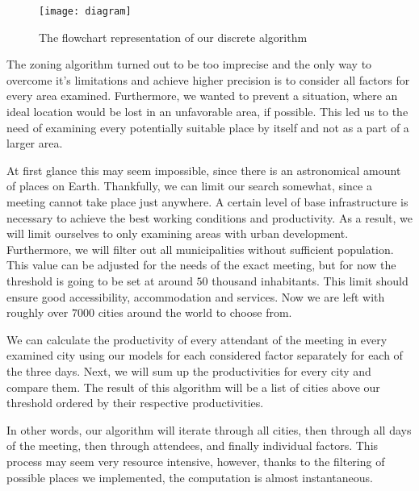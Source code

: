 

\begin{figure}
    \centering
        \texttt{[image: diagram]}
    \caption{The flowchart representation of our discrete algorithm}
\end{figure}

The zoning algorithm turned out to be too imprecise and the only way to overcome it's limitations and achieve higher precision is to consider all factors for every area examined. Furthermore, we wanted to prevent a situation, where an ideal location would be lost in an unfavorable area, if possible. This led us to the need of examining every potentially suitable place by itself and not as a part of a larger area.

At first glance this may seem impossible, since there is an astronomical amount of places on Earth. Thankfully, we can limit our search somewhat, since a meeting cannot take place just anywhere. A certain level of base infrastructure is necessary to achieve the best working conditions and productivity. As a result, we will limit ourselves to only examining areas with urban development. Furthermore, we will filter out all municipalities without sufficient population. This value can be adjusted for the needs of the exact meeting, but for now the threshold is going to be set at around $50$ thousand inhabitants. This limit should ensure good accessibility, accommodation and services. Now we are left with roughly over $7000$ cities around the world to choose from.

We can calculate the productivity of every attendant of the meeting in every examined city using our models for each considered factor separately for each of the three days. Next, we will sum up the productivities for every city and compare them. The result of this algorithm will be a list of cities above our threshold ordered by their respective productivities.

In other words, our algorithm will iterate through all cities, then through all days of the meeting, then through attendees, and finally individual factors. This process may seem very resource intensive, however,
thanks to the filtering of possible places we implemented, the computation is almost instantaneous.

